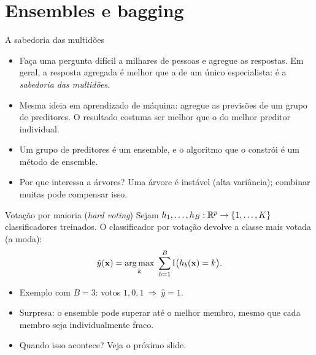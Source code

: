 \section{Ensembles e bagging}\label{sec:bagging}

\begin{frame}{A sabedoria das multidões}
\begin{itemize}
  \item Faça uma pergunta difícil a milhares de pessoas e agregue as respostas. Em geral, a resposta agregada é \alert{melhor} que a de um único especialista: é a \emph{sabedoria das multidões}.
  \item Mesma ideia em aprendizado de máquina: agregue as previsões de um \alert{grupo de preditores}. O resultado costuma ser melhor que o do melhor preditor individual.
  \item Um grupo de preditores é um \alert{ensemble}, e o algoritmo que o constrói é um \alert{método de ensemble}.
  \item Por que interessa a árvores? Uma árvore é \alert{instável} (alta variância); combinar muitas pode compensar isso.
\end{itemize}
\vspace{4pt}
\centering
{}

\end{frame}

\begin{frame}{Votação por maioria (\emph{hard voting})}
Sejam $h_1,\dots,h_B:\mathbb{R}^p\to\{1,\dots,K\}$ classificadores treinados. O \alert{classificador por votação} devolve a classe mais votada (a moda):
\[
\hat y(\mathbf x)=\argmax_{k}\ \sum_{b=1}^{B}\ind\bigl(h_b(\mathbf x)=k\bigr).
\]
\begin{itemize}
  \item Exemplo com $B=3$: votos $1,0,1\ \Rightarrow\ \hat y=1$.
  \item Surpresa: o ensemble pode superar \alert{até o melhor} membro, mesmo que cada membro seja individualmente fraco.
  \item Quando isso acontece? Veja o próximo slide.
\end{itemize}
\end{frame}


